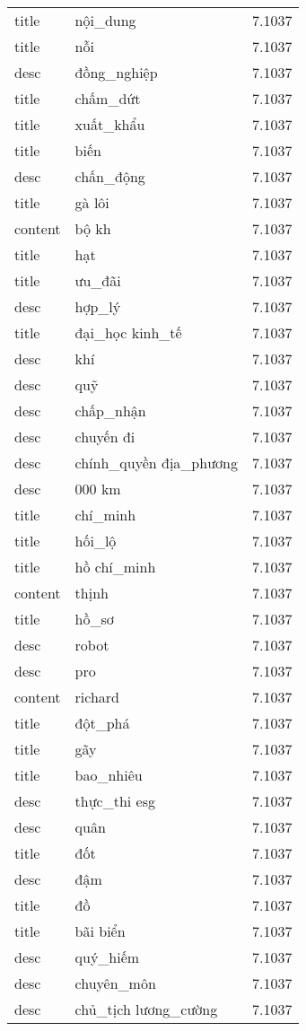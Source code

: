 \documentclass{article}
\begin{document}
\begin{tabular}{lll}
title & nội\_dung & 7.1037\\
title & nỗi & 7.1037\\
desc & đồng\_nghiệp & 7.1037\\
title & chấm\_dứt & 7.1037\\
title & xuất\_khẩu & 7.1037\\
title & biến & 7.1037\\
desc & chấn\_động & 7.1037\\
title & gà lôi & 7.1037\\
content & bộ kh & 7.1037\\
title & hạt & 7.1037\\
title & ưu\_đãi & 7.1037\\
desc & hợp\_lý & 7.1037\\
title & đại\_học kinh\_tế & 7.1037\\
desc & khí & 7.1037\\
desc & quỹ & 7.1037\\
desc & chấp\_nhận & 7.1037\\
desc & chuyến đi & 7.1037\\
desc & chính\_quyền địa\_phương & 7.1037\\
desc & 000 km & 7.1037\\
title & chí\_minh & 7.1037\\
title & hối\_lộ & 7.1037\\
title & hồ chí\_minh & 7.1037\\
content & thịnh & 7.1037\\
title & hồ\_sơ & 7.1037\\
desc & robot & 7.1037\\
desc & pro & 7.1037\\
content & richard & 7.1037\\
title & đột\_phá & 7.1037\\
title & gãy & 7.1037\\
title & bao\_nhiêu & 7.1037\\
desc & thực\_thi esg & 7.1037\\
desc & quân & 7.1037\\
title & đốt & 7.1037\\
desc & đậm & 7.1037\\
title & đồ & 7.1037\\
title & bãi biển & 7.1037\\
desc & quý\_hiếm & 7.1037\\
desc & chuyên\_môn & 7.1037\\
desc & chủ\_tịch lương\_cường & 7.1037\\

\end{tabular}
\end{document}
